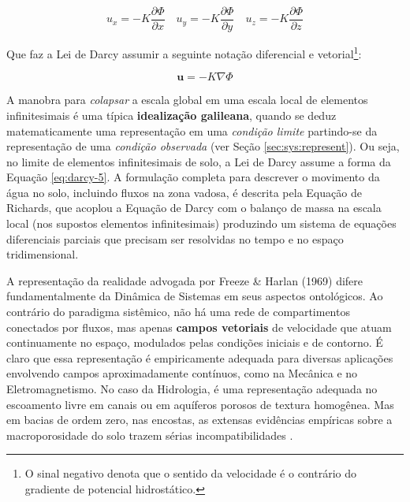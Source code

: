\documentclass[./main.tex]{subfiles}
\begin{document}
\begin{linenomath*}
\begin{equation}
\label{eq:darcy-4}
u_x = - K\frac{\partial \Phi}{\partial x} \quad 
u_y = - K\frac{\partial \Phi}{\partial y} \quad 
u_z = - K\frac{\partial \Phi}{\partial z}
\end{equation}
\end{linenomath*}
\noindent Que faz a Lei de Darcy assumir a seguinte notação diferencial e vetorial\footnote{O sinal negativo denota que o sentido da velocidade é o contrário do gradiente de potencial hidrostático.}:
\begin{linenomath*}
\begin{equation}
\label{eq:darcy-5}
\textbf{u} = - K \nabla \Phi
\end{equation}
\end{linenomath*}

\par A manobra para \textit{colapsar} a escala global em uma escala local de elementos infinitesimais é uma típica \textbf{idealização galileana}, quando se deduz matematicamente uma representação em uma \textit{condição limite} partindo-se da representação de uma \textit{condição observada}  (ver Seção \ref{sec:sys:represent}). Ou seja, no limite de elementos infinitesimais de solo, a Lei de Darcy assume a forma da Equação \eqref{eq:darcy-5}. A formulação completa para descrever o movimento da água no solo, incluindo fluxos na zona vadosa, é descrita pela Equação de Richards, que acoplou a Equação de Darcy com o balanço de massa na escala local (nos supostos elementos infinitesimais) produzindo um sistema de equações diferenciais parciais que precisam ser resolvidas no tempo e no espaço tridimensional. 

\par A representação da realidade advogada por Freeze \& Harlan (1969) difere fundamentalmente da Dinâmica de Sistemas em seus aspectos ontológicos. Ao contrário do paradigma sistêmico, não há uma rede de compartimentos conectados por fluxos, mas apenas \textbf{campos vetoriais} de velocidade que atuam continuamente no espaço, modulados pelas condições iniciais e de contorno. É claro que essa representação é empiricamente adequada para diversas aplicações envolvendo campos aproximadamente contínuos, como na Mecânica e no Eletromagnetismo. No caso da Hidrologia, é uma representação adequada no escoamento livre em canais ou em aquíferos porosos de textura homogênea. Mas em bacias de ordem zero, nas encostas, as extensas evidências empíricas sobre a macroporosidade do solo trazem sérias incompatibilidades \cite{Beven2019a}. 
\end{document}
